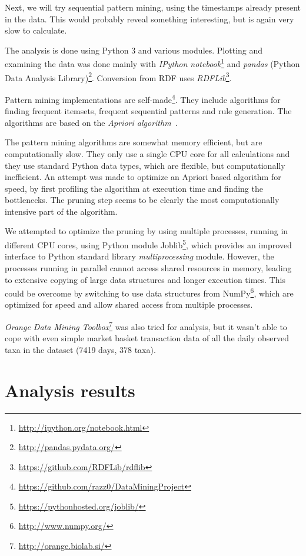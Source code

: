 \documentclass[english]{tktltiki2}
\begin{document}
Next, we will try sequential pattern mining, using the timestamps already present in the data. This would probably reveal something interesting, but is again very slow to calculate.

The analysis is done using Python 3 and various modules. Plotting and examining the data was done mainly with \emph{IPython notebook}\footnote{\url{http://ipython.org/notebook.html}} and \emph{pandas} (Python Data Analysis Library)\footnote{\url{http://pandas.pydata.org/}}. Conversion from RDF uses \emph{RDFLib}\footnote{\url{https://github.com/RDFLib/rdflib}}. 

Pattern mining implementations are self-made\footnote{\url{https://github.com/razz0/DataMiningProject}}. They include algorithms for finding frequent itemsets, frequent sequential patterns and rule generation. The algorithms are based on the \emph{Apriori algorithm}~\cite{tan2006introduction}.

The pattern mining algorithms are somewhat memory efficient, but are computationally slow. They only use a single CPU core for all calculations and they use standard Python data types, which are flexible, but computationally inefficient. An attempt was made to optimize an Apriori based algorithm for speed, by first profiling the algorithm at execution time and finding the bottlenecks. The pruning step seems to be clearly the most computationally intensive part of the algorithm. %

We attempted to optimize the pruning by using multiple processes, running in different CPU cores, using Python module Joblib\footnote{\url{https://pythonhosted.org/joblib/}}, which provides an improved interface to Python standard library \emph{multiprocessing} module. However, the processes running in parallel cannot access shared resources in memory, leading to extensive copying of large data structures and longer execution times. This could be overcome by switching to use data structures from NumPy\footnote{\url{http://www.numpy.org/}}, which are optimized for speed and allow shared access from multiple processes.


\emph{Orange Data Mining Toolbox}\footnote{\url{http://orange.biolab.si/}} was also tried for analysis, but it wasn't able to cope with even simple market basket transaction data of all the daily observed taxa in the dataset (7419 days, 378 taxa).


\section{Analysis results}
\end{document}
